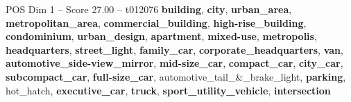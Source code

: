 \begin{textsample}{POS Dim 1 – Score 27.00 – t012076}  \label{ex:f1_pos_005}
\textbf{building}, \textbf{city}, \textbf{urban\_area}, \textbf{metropolitan\_area}, \textbf{commercial\_building}, \textbf{high-rise\_building}, \textbf{condominium}, \textbf{urban\_design}, \textbf{apartment}, \textbf{mixed-use}, \textbf{metropolis}, \textbf{headquarters}, \textbf{street\_light}, \textbf{family\_car}, \textbf{corporate\_headquarters}, \textbf{van}, \textbf{automotive\_side-view\_mirror}, \textbf{mid-size\_car}, \textbf{compact\_car}, \textbf{city\_car}, \textbf{subcompact\_car}, \textbf{full-size\_car}, automotive\_tail\_\&\_brake\_light, \textbf{parking}, hot\_hatch, \textbf{executive\_car}, \textbf{truck}, \textbf{sport\_utility\_vehicle}, \textbf{intersection}

\end{textsample}
